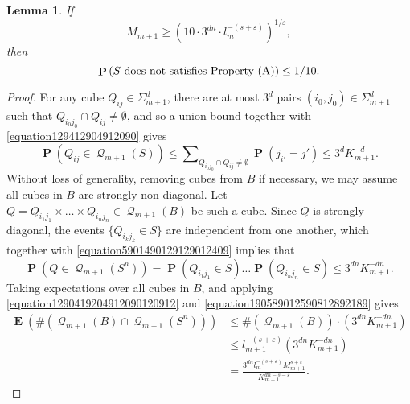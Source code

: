 \documentclass[12pt,reqno]{article}
\numberwithin{equation}{section}
\newtheorem{lemma}[theorem]{Lemma}
\DeclareMathOperator{\EE}{\mathbf{E}}
\DeclareMathOperator{\PP}{\mathbf{P}}
\DeclareMathOperator{\DQ}{\mathcal{Q}}
\begin{document}
\begin{lemma} \label{propertyALemma}
    If
    \begin{equation} \label{equation194012904129009}
        M_{m+1} \geq \left( 10 \cdot 3^{dn} \cdot l_m^{-(s + \varepsilon)} \right)^{1/\varepsilon},
    \end{equation}
    then
    \[ \PP \left(S\ \text{\normalfont{does not satisfies Property (A)}} \right) \leq 1/10. \]
\end{lemma}
\begin{proof}
    For any cube $Q_{ij} \in \Sigma_{m+1}^d$, there are at most $3^d$ pairs $(i_0,j_0) \in \Sigma_{m+1}^d$ such that $Q_{i_0j_0} \cap Q_{ij} \neq \emptyset$, and so a union bound together with \eqref{equation129412904912090} gives
    \begin{equation} \label{equation5901490129129012409}
        \PP(Q_{ij} \in \DQ_{m+1}(S)) \leq \sum\nolimits_{Q_{i_0j_0} \cap Q_{ij} \neq \emptyset} \PP(j_{i'} = j') \leq 3^d K_{m+1}^{-d}.
    \end{equation}
    Without loss of generality, removing cubes from $B$ if necessary, we may assume all cubes in $B$ are strongly non-diagonal. Let $Q = Q_{i_1j_1} \times \dots \times Q_{i_nj_n} \in \DQ_{m+1}(B)$ be such a cube. Since $Q$ is strongly diagonal, the events $\{ Q_{i_kj_k} \in S \}$ are independent from one another, which together with \eqref{equation5901490129129012409} implies that
    \begin{equation} \label{equation190589012590812892189}
       \PP(Q \in \DQ_{m+1}(S^n)) = \PP(Q_{i_1j_1} \in S) \dots \PP(Q_{i_nj_n} \in S) \leq 3^{dn} K_{m+1}^{-dn}.
    \end{equation}
    Taking expectations over all cubes in $B$, and applying \eqref{equation1290419204912090120912} and \eqref{equation190589012590812892189} gives
    \begin{equation} \label{equation129041289589128921891289}
    \begin{split}
        \EE(\#(\DQ_{m+1}(B) \cap \DQ_{m+1}(S^n))) &\leq \#(\DQ_{m+1}(B)) \cdot (3^{dn} K_{m+1}^{-dn})\\
        &\leq l_{m+1}^{-(s + \varepsilon)} (3^{dn} K_{m+1}^{- dn})\\
        &= \frac{3^{dn} l_m^{-(s + \varepsilon)} M_{m+1}^{s + \varepsilon}}{K_{m+1}^{dn - s - \varepsilon}}.
    \end{split}
    \end{equation}

\end{proof}
\end{document}

